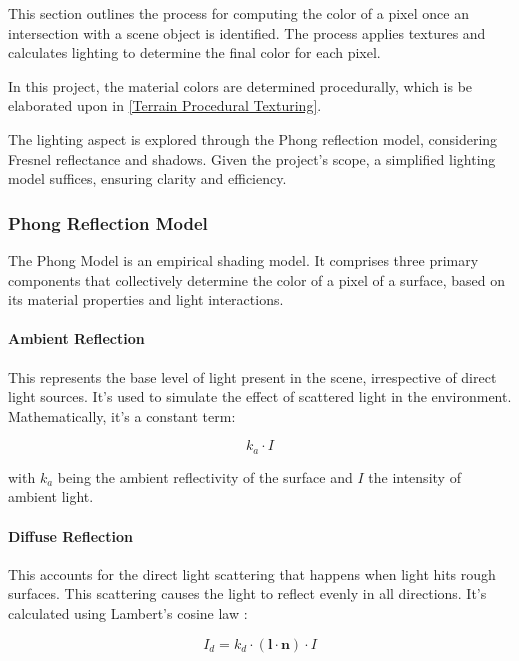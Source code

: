 This section outlines the process for computing the color of a pixel once an intersection with a scene object is identified. The process applies textures and calculates lighting to determine the final color for each pixel.

In this project, the material colors are determined procedurally, which is be elaborated upon in \ref{Terrain Procedural Texturing}.

The lighting aspect is explored through the Phong reflection model, considering Fresnel reflectance and shadows. Given the project's scope, a simplified lighting model suffices, ensuring clarity and efficiency.

\subsubsection{Phong Reflection Model}
\label{Phong}

The Phong Model is an empirical shading model. It comprises three primary components that collectively determine the color of a pixel of a surface,  based on its material properties and light interactions.

\paragraph{Ambient Reflection} This represents the base level of light present in the scene, irrespective of direct light sources. It's used to simulate the effect of scattered light in the environment. Mathematically, it's a constant term:

\begin{equation}
\label{ambient}
k_a \cdot I
\end{equation}

with $k_a$ being the ambient reflectivity of the surface and $I$ the intensity of ambient light.

\paragraph{Diffuse Reflection} This accounts for the direct light scattering that happens when light hits rough surfaces. This scattering causes the light to reflect evenly in all directions. It's calculated using Lambert’s cosine law : 
    
\begin{equation}
\label{diffuse}
I_d = k_d \cdot (\mathbf{l} \cdot \mathbf{n}) \cdot I
\end{equation}

